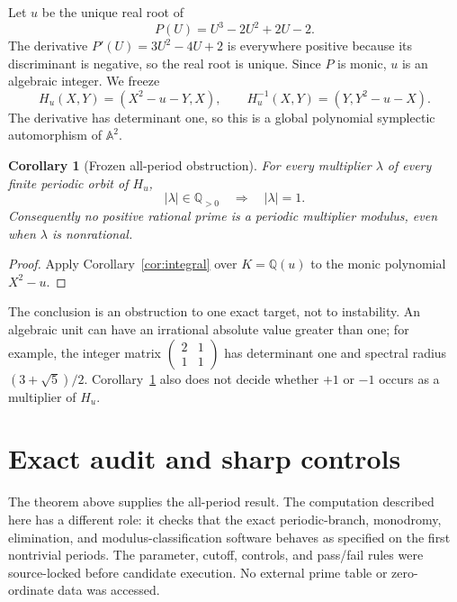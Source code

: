 \documentclass[11pt]{article}
\newtheorem{corollary}[theorem]{Corollary}
\theoremstyle{definition}
\theoremstyle{remark}
\newcommand{\A}{\mathbb A}
\newcommand{\Q}{\mathbb Q}
\newcommand{\Hu}{H_u}
\begin{document}
Let $u$ be the unique real root of
\begin{equation}
 P(U)=U^3-2U^2+2U-2.
 \label{eq:parameter-polynomial}
\end{equation}
The derivative $P'(U)=3U^2-4U+2$ is everywhere positive because its
discriminant is negative, so the real root is unique.  Since $P$ is monic,
$u$ is an algebraic integer.  We freeze
\begin{equation}
 \Hu(X,Y)=(X^2-u-Y,X),\qquad
 \Hu^{-1}(X,Y)=(Y,Y^2-u-X).
 \label{eq:frozen-map}
\end{equation}
The derivative has determinant one, so this is a global polynomial
symplectic automorphism of $\A^2$.

\begin{corollary}[Frozen all-period obstruction]
\label{cor:frozen}
For every multiplier $\lambda$ of every finite periodic orbit of $\Hu$,
\[
 |\lambda|\in\Q_{>0}\quad\Longrightarrow\quad |\lambda|=1.
\]
Consequently no positive rational prime is a periodic multiplier modulus,
even when $\lambda$ is nonrational.
\end{corollary}

\begin{proof}
Apply Corollary~\ref{cor:integral} over $K=\Q(u)$ to the monic polynomial
$X^2-u$.
\end{proof}

The conclusion is an obstruction to one exact target, not to instability.
An algebraic unit can have an irrational absolute value greater than one; for
example, the integer matrix
$\left(\begin{smallmatrix}2&1\\1&1\end{smallmatrix}\right)$ has determinant
one and spectral radius $(3+\sqrt5)/2$.  Corollary~\ref{cor:frozen} also does
not decide whether $+1$ or $-1$ occurs as a multiplier of $\Hu$.

\section{Exact audit and sharp controls}
\label{sec:audit}

The theorem above supplies the all-period result.  The computation described
here has a different role: it checks that the exact periodic-branch,
monodromy, elimination, and modulus-classification software behaves as
specified on the first nontrivial periods.  The parameter, cutoff, controls,
and pass/fail rules were source-locked before candidate execution.  No
external prime table or zero-ordinate data was accessed.
\end{document}

